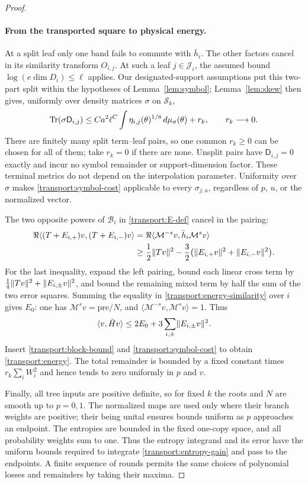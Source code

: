 \begin{proof}
\paragraph{From the transported square to physical energy.}
At a split leaf only one band fails to commute with $\bar h_i$.
The other factors cancel in its similarity transform $O_{i,j}$.
At such a leaf $j\in\mathcal J_i$, the assumed bound
$\log(e\dim D_i)\leq\ell$ applies.  Our designated-support assumptions
put this two-part split within the hypotheses of
Lemma~\ref{lem:symbol}; Lemma~\ref{lem:skew}
then gives, uniformly over density matrices $\sigma$ on $\mathcal S_k$,
\begin{equation}\label{transport:symbol-cost}
 \operatorname{Tr}(\sigma\mathsf D_{i,j})
 \leq C a^2\ell^C\int\eta_{i,j}(\theta)^{1/8}
               \,d\mu_\sigma(\theta)+r_k,
 \qquad r_k\longrightarrow0.
\end{equation}
There are finitely many split term--leaf pairs, so one common
$r_k\geq0$ can be chosen for all of them; take $r_k=0$ if there are none.
Unsplit pairs have $\mathsf D_{i,j}=0$ exactly and incur no symbol
remainder or support-dimension factor.  These terminal metrics do not depend
on the interpolation parameter.  Uniformity over $\sigma$ makes
\eqref{transport:symbol-cost} applicable to every $\sigma_{j,u}$,
regardless of $p$, $u$, or the normalized vector.

The two opposite powers of $\mathcal B_i$ in
\eqref{transport:E-def} cancel in the pairing:
\begin{align}\label{transport:energy-similarity}
 \Re\langle(T+E_{i,+})v,(T+E_{i,-})v\rangle
 &=\Re\langle\mathcal M^{-s}v,\bar h_i\mathcal M^s v\rangle
 \notag\\
 &\geq\frac12\lVert Tv\rVert^2
       -\frac32\bigl(\lVert E_{i,+}v\rVert^2+\lVert E_{i,-}v\rVert^2\bigr).
\end{align}
For the last inequality, expand the left pairing, bound each linear
cross term by $\frac14\lVert Tv\rVert^2+\lVert E_{i,\pm}v\rVert^2$, and bound
the remaining mixed term by half the sum of the two error squares.
Summing the equality in \eqref{transport:energy-similarity} over $i$
gives $E_0$: one has $\mathcal M^s v=\mathrm{pre}/N$, and
$\langle\mathcal M^{-s}v,\mathcal M^s v\rangle=1$.
Thus
\[
 \langle v,\bar Hv\rangle
 \leq 2E_0+3\sum_{i,\pm}\lVert E_{i,\pm}v\rVert^2.
\]
Insert \eqref{transport:block-bound} and
\eqref{transport:symbol-cost} to obtain \eqref{transport:energy}.
The total remainder is bounded by a fixed constant times
$r_k\sum_iW_i^2$ and hence tends to zero uniformly in $p$ and $v$.

Finally, all tree inputs are positive definite, so for fixed $k$ the
roots and $N$ are smooth up to $p=0,1$.  The normalized maps are used
only where their branch weights are positive; their being unital
ensures bounds uniform as $p$ approaches an endpoint.  The entropies
are bounded in the fixed one-copy space, and all probability weights
sum to one.  Thus the entropy integrand and its error have the uniform
bounds required to integrate \eqref{transport:entropy-gain} and pass to
the endpoints.  A finite sequence of rounds permits the same choices
of polynomial losses and remainders by taking their maxima.
\end{proof}

